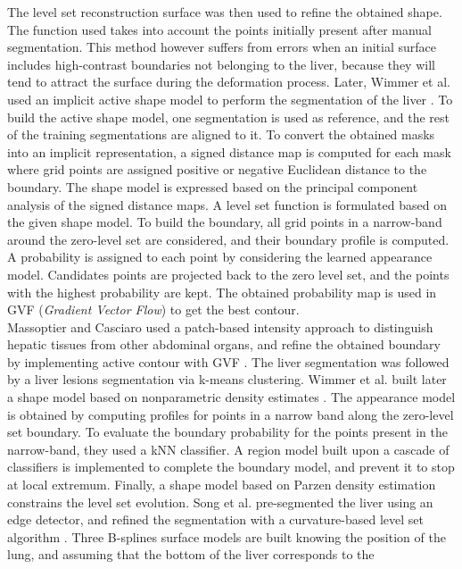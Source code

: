 \documentclass[]{article}
\begin{document}
	
	The level set reconstruction surface was then used to refine the
	obtained shape. The function used takes into account the points
	initially present after manual segmentation. This method however suffers
	from errors when an initial surface includes high-contrast boundaries
	not belonging to the liver, because they will tend to attract the
	surface during the deformation process. Later, Wimmer et al. used an implicit active shape model to perform the
	segmentation of the liver \cite{Wimmer2008}. To build the active shape model, one
	segmentation is used as reference, and the rest of the training
	segmentations are aligned to it. To convert the obtained masks into an
	implicit representation, a signed distance map is computed for each mask
	where grid points are assigned positive or negative Euclidean distance
	to the boundary. The shape model is expressed based on the principal
	component analysis of the signed distance maps. A level set function is
	formulated based on the given shape model. To build the boundary, all
	grid points in a narrow-band around the zero-level set are considered,
	and their boundary profile is computed. A probability is assigned to
	each point by considering the learned appearance model. Candidates
	points are projected back to the zero level set, and the points with the
	highest probability are kept. The obtained probability map is used in
	GVF (\emph{Gradient Vector Flow}) to get the best contour.\\
	Massoptier and Casciaro used a patch-based intensity approach to distinguish
	hepatic tissues from other abdominal organs, and refine the obtained
	boundary by implementing active contour with GVF \cite{Massoptier2008}. The liver segmentation
	was followed by a liver lesions segmentation via k-means clustering. Wimmer et al. built later a shape model based on nonparametric density
	estimates \cite{Wimmer2009}. The appearance model is obtained by computing profiles for
	points in a narrow band along the zero-level set boundary. To evaluate
	the boundary probability for the points present in the narrow-band, they
	used a kNN classifier. A region model built upon a cascade of
	classifiers is implemented to complete the boundary model, and prevent
	it to stop at local extremum. Finally, a shape model based on Parzen
	density estimation constrains the level set evolution. Song et al. pre-segmented the liver using an edge detector, and
	refined the segmentation with a curvature-based level set algorithm \cite{Song2009}.
	Three B-splines surface models are built knowing the position of the
	lung, and assuming that the bottom of the liver corresponds to the
\end{document}
